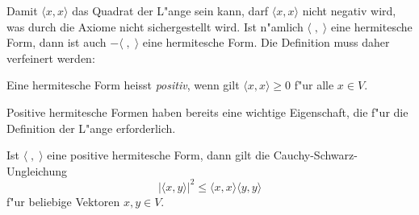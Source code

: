 Damit $\langle x,x\rangle$ das Quadrat der L"ange sein kann, darf
$\langle x,x\rangle$ nicht negativ wird, was
durch die Axiome nicht sichergestellt wird.
Ist n"amlich $\langle\;,\;\rangle$ eine hermitesche Form, dann ist
auch $-\langle\;,\;\rangle$ eine hermitesche Form.
Die Definition muss daher verfeinert werden:

\begin{definition}
\label{hilbert:postiveform}
Eine hermitesche Form heisst {\em positiv}, wenn gilt
$\langle x,x\rangle \ge 0$ f"ur alle $x\in V$.
\end{definition}

Positive hermitesche Formen haben bereits eine wichtige Eigenschaft,
die f"ur die Definition der L"ange erforderlich.

\begin{satz} Ist $\langle\;,\;\rangle$ eine positive hermitesche
Form, dann gilt die Cauchy-Schwarz-Ungleichung
\[
|\langle x,y\rangle|^2 \le \langle x,x\rangle\langle y,y\rangle
\]
f"ur beliebige Vektoren $x,y\in V$.
\end{satz}

